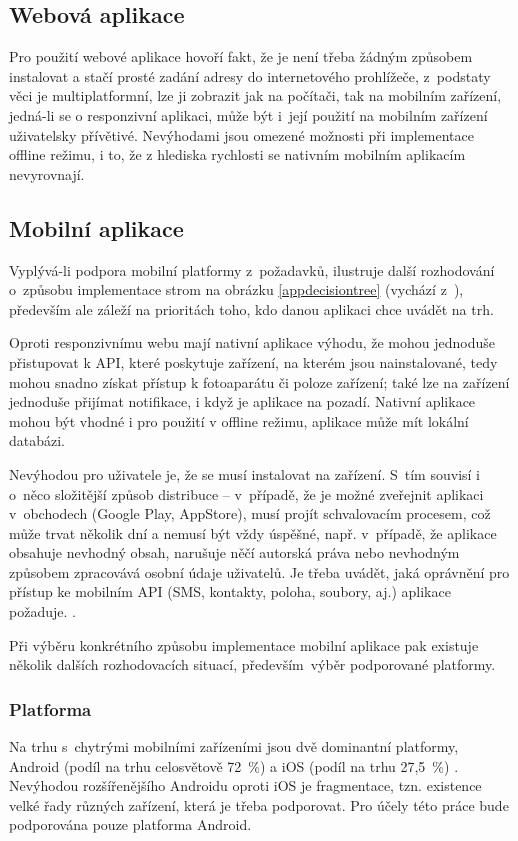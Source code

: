\documentclass[twoside]{ctuthesis}
\begin{document}
\subsection{Webová aplikace}
Pro použití webové aplikace hovoří fakt, že je není třeba žádným způsobem instalovat a stačí prosté zadání adresy do internetového prohlížeče, z~podstaty věci je multiplatformní, lze ji zobrazit jak na počítači, tak na mobilním zařízení, jedná-li se o responzivní aplikaci, může být i~její použití na mobilním zařízení uživatelsky přívětivé. Nevýhodami jsou omezené možnosti při implementace offline režimu, i to, že z hlediska rychlosti se nativním mobilním aplikacím nevyrovnají. \cite{stevens2018what}

\subsection{Mobilní aplikace}

Vyplývá-li podpora mobilní platformy z~požadavků, ilustruje další rozhodování o~způsobu implementace strom na obrázku \ref{appdecisiontree} (vychází z~\cite{matyunina2020native}), především ale záleží na prioritách toho, kdo danou aplikaci chce uvádět na trh.

Oproti responzivnímu webu mají nativní aplikace výhodu, že mohou jednoduše přistupovat k API, které poskytuje zařízení, na kterém jsou nainstalované, tedy mohou snadno získat přístup k fotoaparátu či poloze zařízení; také lze na zařízení jednoduše přijímat notifikace, i když je aplikace na pozadí. Nativní aplikace mohou být vhodné i pro použití v offline režimu, aplikace může mít lokální databázi.

Nevýhodou pro uživatele je, že se musí instalovat na zařízení. S~tím souvisí i o~něco složitější způsob distribuce -- v~případě, že je možné zveřejnit aplikaci v~obchodech (Google Play, AppStore), musí projít schvalovacím procesem, což může trvat několik dní a nemusí být vždy úspěšné, např. v~případě, že aplikace obsahuje nevhodný obsah, narušuje něčí autorská práva nebo nevhodným způsobem zpracovává osobní údaje uživatelů. Je třeba uvádět, jaká oprávnění pro přístup ke mobilním API (SMS, kontakty, poloha, soubory, aj.) aplikace požaduje. \cite{google2021policy}.

Při výběru konkrétního způsobu implementace mobilní aplikace pak existuje několik dalších rozhodovacích situací, především~výběr podporované platformy.

\subsubsection{Platforma}
Na trhu s~chytrými mobilními zařízeními jsou dvě dominantní platformy, Android (podíl na trhu celosvětově 72~\%) a iOS (podíl na trhu 27,5~\%) \cite{statcounter2021mobile}. Nevýhodou rozšířenějšího Androidu oproti iOS je fragmentace, tzn. existence velké řady různých zařízení, která je třeba podporovat. Pro účely této práce bude podporována pouze platforma Android.
\end{document}
